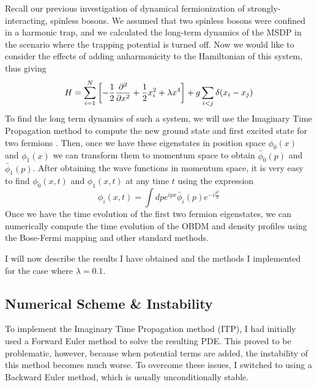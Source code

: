 \documentclass[onecolumn,english,aps,pra]{revtex4}
\begin{document}
Recall our previous investigation of dynamical fermionization of strongly-interacting, spinless bosons. We assumed that two spinless bosons were confined in a harmonic trap, and we calculated the long-term dynamics of the MSDP in the scenario where the trapping potential is turned off. Now we would like to consider the effects of adding anharmonicity to the Hamiltonian of this system, thus giving 
\begin{equation}
    H = \sum_{i = 1}^{N} \left[ -\frac{1}{2} \pdv[2]{}{x} + \frac{1}{2} x_i^2 + \lambda x^4 \right]
            + g \sum_{i < j} \delta(x_i - x_j)
\end{equation}
To find the long term dynamics of such a system, we will use the Imaginary Time Propagation method to compute the new ground state and first excited state for two fermions \cite{chiofalo2000ground, muruganandam2009fortran}. Then, once we have these eigenstates in position space $\phi_0(x)$ and $\phi_1(x)$ we can transform them to momentum space to obtain $\widetilde{\phi_0}(p)$ and $\widetilde{\phi_1}(p)$. After obtaining the wave functions in momentum space, it is very easy to find $\phi_0(x,t)$ and $\phi_1(x,t)$ at any time $t$ using the expression
\begin{equation}
\phi_i(x,t) = \int dp e^{ipx} \widetilde{\phi_i}(p) e^{-i\frac{p^2}{2}}
\label{timeEvolution}
\end{equation}
Once we have the time evolution of the first two fermion eigenstates, we can numerically compute the time evolution of the OBDM and density profiles using the Bose-Fermi mapping and other standard methods.

I will now describe the results I have obtained and the methods I implemented for the case where $\lambda = 0.1$.

\subsection*{Numerical Scheme \& Instability}

To implement the Imaginary Time Propagation method (ITP), I had initially used a Forward Euler method to solve the resulting PDE. This proved to be problematic, however, because when potential terms are added, the instability of this method becomes much worse. To overcome these issues, I switched to using a Backward Euler method, which is usually unconditionally stable.
\end{document}

